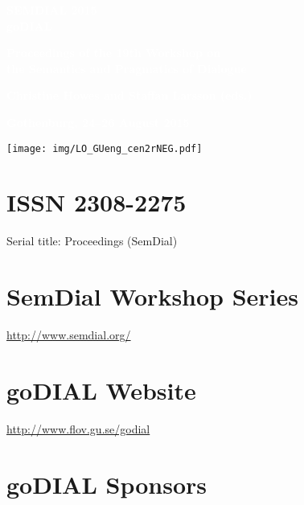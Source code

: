 \documentclass[a4paper,12pt,oneside]{book}
\begin{document}
\pagecolor{GUblue} %
\thispagestyle{empty}
\vspace*{1.7cm}


\textcolor{white}{\begin{center} \Huge \bf
SEMDIAL 2015\\
goDIAL
\end{center}
\vfill
\begin{center} \LARGE \bf
Proceedings of the 19th Workshop on\\
the Semantics and Pragmatics of Dialogue
\end{center}
\begin{center}\large \bf
Christine Howes and Staffan Larsson (eds.)
\end{center}
\vfill
\begin{center}\large \bf
Gothenburg, 24--26 August 2015
\end{center}}
\vfill
\begin{center} 
\texttt{[image: img/LO\_GUeng\_cen2rNEG.pdf]}
\end{center}

\clearpage
\thispagestyle{empty}
\nopagecolor
\section*{ISSN 2308-2275}
Serial title: Proceedings (SemDial)

\section*{SemDial Workshop Series}
\url{http://www.semdial.org/}

\section*{goDIAL Website}
\url{http://www.flov.gu.se/godial}

\vfill
\section*{goDIAL Sponsors}
\end{document}
